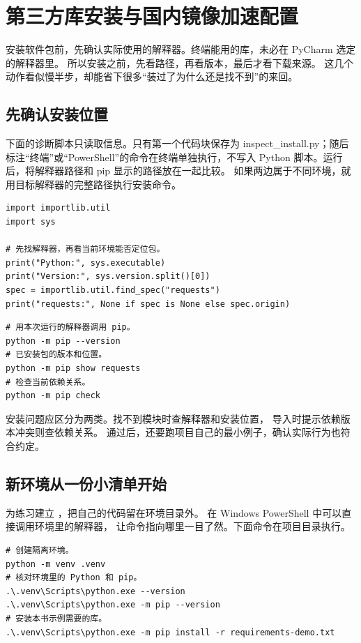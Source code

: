 \documentclass[UTF8,a4paper,oneside,openany,fontset=none,11pt]{ctexbook}
\newcommand{\code}[1]{\texttt{\detokenize{#1}}}
\begin{document}

\appendix
\chapter{第三方库安装与国内镜像加速配置}

安装软件包前，先确认实际使用的解释器。终端能用的库，未必在 PyCharm 选定的解释器里。
所以安装之前，先看路径，再看版本，最后才看下载来源。
这几个动作看似慢半步，却能省下很多“装过了为什么还是找不到”的来回。

\section{先确认安装位置}

下面的诊断脚本只读取信息。只有第一个代码块保存为 inspect\_install.py；随后标注“终端”或“PowerShell”的命令在终端单独执行，不写入 Python 脚本。运行后，将解释器路径和 pip 显示的路径放在一起比较。
如果两边属于不同环境，就用目标解释器的完整路径执行安装命令。
\begin{lstlisting}[title={\code{inspect_install.py}}]
import importlib.util
import sys

# 先找解释器，再看当前环境能否定位包。
print("Python:", sys.executable)
print("Version:", sys.version.split()[0])
spec = importlib.util.find_spec("requests")
print("requests:", None if spec is None else spec.origin)
\end{lstlisting}

\begin{lstlisting}[language={},title={终端命令（非Python脚本）}]
# 用本次运行的解释器调用 pip。
python -m pip --version
# 已安装包的版本和位置。
python -m pip show requests
# 检查当前依赖关系。
python -m pip check
\end{lstlisting}

安装问题应区分为两类。找不到模块时查解释器和安装位置，
导入时提示依赖版本冲突则查依赖关系。
\code{pip check} 通过后，还要跑项目自己的最小例子，确认实际行为也符合约定。

\section{新环境从一份小清单开始}

为练习建立 \code{.venv}，把自己的代码留在环境目录外。
在 Windows PowerShell 中可以直接调用环境里的解释器，
让命令指向哪里一目了然。下面命令在项目目录执行。
\begin{lstlisting}[language={},title={PowerShell终端（非Python脚本）}]
# 创建隔离环境。
python -m venv .venv
# 核对环境里的 Python 和 pip。
.\.venv\Scripts\python.exe --version
.\.venv\Scripts\python.exe -m pip --version
# 安装本书示例需要的库。
.\.venv\Scripts\python.exe -m pip install -r requirements-demo.txt
\end{lstlisting}
\end{document}
